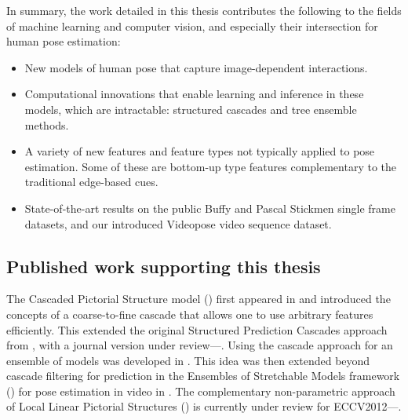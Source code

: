 In summary, the work detailed in this thesis contributes the following to the 
fields of machine learning and computer vision, and especially their 
intersection for human pose estimation:
\begin{itemize}

\item New models of human pose that capture image-dependent interactions.

\item Computational innovations that enable learning and inference in these 
models, which are \naively intractable: structured cascades and tree ensemble 
methods.

\item A variety of new features and feature types not typically applied to pose 
estimation.  Some of these are bottom-up type features complementary to the 
traditional edge-based cues.

\item State-of-the-art results on the public Buffy and Pascal Stickmen single 
frame datasets, and our introduced Videopose video sequence dataset.

\end{itemize}


\subsection{Published work supporting this thesis}


The Cascaded Pictorial Structure model () first appeared in 
\citet{sapp2010cascades} and introduced the concepts of a coarse-to-fine 
cascade that allows one to use arbitrary features efficiently.  This extended 
the original Structured Prediction Cascades approach from \citet{cascades}, 
with a journal version under review---\citet{cascades-jmlr}.
Using the cascade approach for an ensemble of models was developed in 
\citet{weisssapp10}.  This idea was then extended beyond cascade filtering for 
prediction in the Ensembles of Stretchable Models framework 
() for pose estimation in video in \citet{sapp2011}.  The 
complementary non-parametric approach of Local Linear Pictorial Structures 
() is currently under review for ECCV2012---\citet{sapp-llps}.
